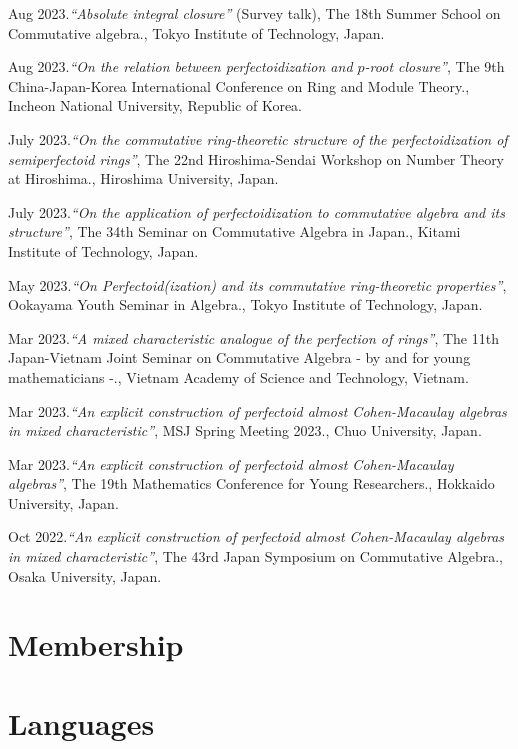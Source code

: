 \documentclass[10pt,a4paper,sans]{moderncv}
\begin{document}
\begin{etaremune}
  \item Aug 2023.\emph{``Absolute integral closure''} (Survey talk), \textsf{The 18th Summer School on Commutative algebra.}, Tokyo Institute of Technology, Japan.
  \item Aug 2023.\emph{``On the relation between perfectoidization and \(p\)-root closure''}, \textsf{The 9th China-Japan-Korea International Conference on Ring and Module Theory.}, Incheon National University, Republic of Korea.
  \item July 2023.\emph{``On the commutative ring-theoretic structure of the perfectoidization of semiperfectoid rings''}, \textsf{The 22nd Hiroshima-Sendai Workshop on Number Theory at Hiroshima.}, Hiroshima University, Japan.
  \item July 2023.\emph{``On the application of perfectoidization to commutative algebra and its structure''}, \textsf{The 34th Seminar on Commutative Algebra in Japan.}, Kitami Institute of Technology, Japan.
  \item May 2023.\emph{``On Perfectoid(ization) and its commutative ring-theoretic properties''}, \textsf{Ookayama Youth Seminar in Algebra.}, Tokyo Institute of Technology, Japan.
  \item Mar 2023.\emph{``A mixed characteristic analogue of the perfection of rings''}, \textsf{The 11th Japan-Vietnam Joint Seminar on Commutative Algebra - by and for young mathematicians -.}, Vietnam Academy of Science and Technology, Vietnam.
  \item Mar 2023.\emph{``An explicit construction of perfectoid almost Cohen-Macaulay algebras in mixed characteristic''}, \textsf{MSJ Spring Meeting 2023.}, Chuo University, Japan.
  \item Mar 2023.\emph{``An explicit construction of perfectoid almost Cohen-Macaulay algebras''}, \textsf{The 19th Mathematics Conference for Young Researchers.}, Hokkaido University, Japan.
  \item Oct 2022.\emph{``An explicit construction of perfectoid almost Cohen-Macaulay algebras in mixed characteristic''}, \textsf{The 43rd Japan Symposium on Commutative Algebra.}, Osaka University, Japan.
\end{etaremune}


\section{Membership}


\section{Languages}
\end{document}
